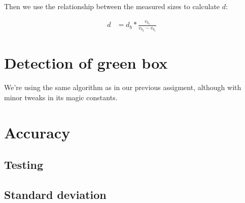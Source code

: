 \documentclass[a4paper,12pt]{article}
\begin{document}
Then we use the relationship between the measured sizes to calculate $d$:

\begin{align*}
  d &= d_b * \frac{v_{b_1}}{v_{b_2} - v_{b_1}}
\end{align*}


\section{Detection of green box}

We're using the same algorithm as in our previous assigment, although with minor
tweaks in its magic constants.


\section{Accuracy}

\subsection{Testing}

\subsection{Standard deviation}
\end{document}
